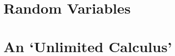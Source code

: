 \documentclass[12pt,notitlepage]{article}
\theoremstyle{plain}
\theoremstyle{definition}
\theoremstyle{plain}
\newcommand{\R}{\mathbb{R}}
\newcommand{\1}{\mathbf{1}}
\newcommand{\0}{\mathbf{0}}
\begin{document}
%
%
%
%
%
%

\section{Random Variables}

\section{An `Unlimited Calculus'}
\end{document}
